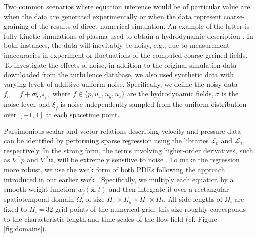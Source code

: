 \documentclass[preprint]{article}
\def\bi#1{\textbf{#1}}
\begin{document}
Two common scenarios where equation inference would be of particular value are when the data are generated experimentally \citep{reinbold2021,joshi2022,golden2023} or when the data represent coarse-graining of the results of direct numerical simulation. An example of the latter is fully kinetic simulations of plasma used to obtain a hydrodynamic description \citep{alves2022}. In both instances, the data will inevitably be noisy, e.g., due to measurement inaccuracies in experiment or fluctuations of the computed coarse-grained fields. To investigate the effects of noise, in addition to the original simulation data downloaded from the turbulence database, we also used synthetic data with varying levels of additive uniform noise. Specifically, we define the noisy data $f_\sigma = f + \sigma \xi_f s_f,$ where $f\in\{p,u_x,u_y,u_z\}$ are the hydrodynamic fields, $\sigma$ is the noise level, and $\xi_f$ is noise independently sampled from the uniform distribution over $[-1,1]$ at each spacetime point.

Parsimonious scalar and vector relations describing velocity and pressure data can be identified by performing sparse regression using the libraries $\mathcal{L}_0$ and $\mathcal{L}_1$, respectively. In the strong form, the terms involving higher-order derivatives, such as $\nabla^2p$ and $\nabla^2{\bi u}$, will be extremely sensitive to noise \citep{rudy2017,reinbold2019}. 
To make the regression more robust, we use the weak form of both PDEs following the approach introduced in our earlier work \citep{gurevich2019}. 
Specifically, we multiply each equation by a smooth weight function $w_j({\bi x},t)$ and then integrate it over a rectangular spatiotemporal domain $\Omega_i$ of size $H_x\times H_y\times H_z\times H_t$. 
All side-lengths of $\Omega_i$ are fixed to $H_i=32$ grid points of the numerical grid; this size roughly corresponds to the characteristic length and time scales of the flow field (cf. Figure \ref{fig:domains}). 
\end{document}

